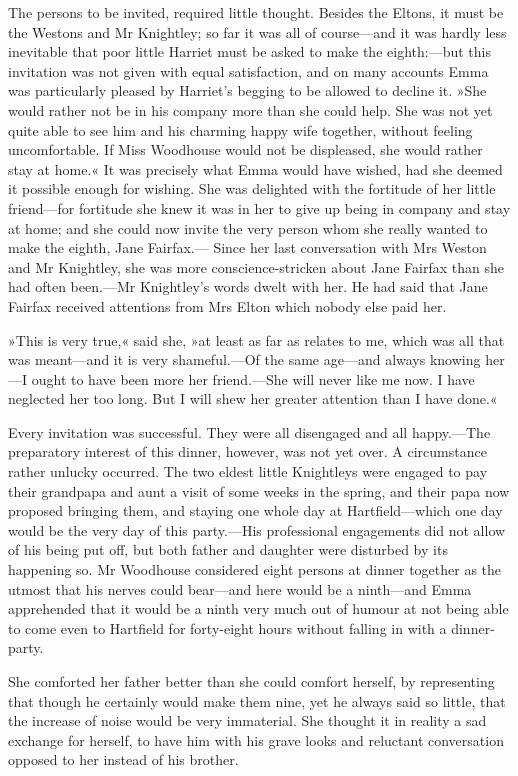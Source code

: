 The persons to be invited, required little thought. Besides the Eltons, it must be the Westons and Mr Knightley; so far it was all of course—and it was hardly less inevitable that poor little Harriet must be asked to make the eighth:—but this invitation was not given with equal satisfaction, and on many accounts Emma was particularly pleased by Harriet's begging to be allowed to decline it. »She would rather not be in his company more than she could help. She was not yet quite able to see him and his charming happy wife together, without feeling uncomfortable. If Miss Woodhouse would not be displeased, she would rather stay at home.« It was precisely what Emma would have wished, had she deemed it possible enough for wishing. She was delighted with the fortitude of her little friend—for fortitude she knew it was in her to give up being in company and stay at home; and she could now invite the very person whom she really wanted to make the eighth, Jane Fairfax.— Since her last conversation with Mrs Weston and Mr Knightley, she was more conscience-stricken about Jane Fairfax than she had often been.—Mr Knightley's words dwelt with her. He had said that Jane Fairfax received attentions from Mrs Elton which nobody else paid her.

»This is very true,« said she, »at least as far as relates to me, which was all that was meant—and it is very shameful.—Of the same age—and always knowing her—I ought to have been more her friend.—She will never like me now. I have neglected her too long. But I will shew her greater attention than I have done.«

Every invitation was successful. They were all disengaged and all happy.—The preparatory interest of this dinner, however, was not yet over. A circumstance rather unlucky occurred. The two eldest little Knightleys were engaged to pay their grandpapa and aunt a visit of some weeks in the spring, and their papa now proposed bringing them, and staying one whole day at Hartfield—which one day would be the very day of this party.—His professional engagements did not allow of his being put off, but both father and daughter were disturbed by its happening so. Mr Woodhouse considered eight persons at dinner together as the utmost that his nerves could bear—and here would be a ninth—and Emma apprehended that it would be a ninth very much out of humour at not being able to come even to Hartfield for forty-eight hours without falling in with a dinner-party.

She comforted her father better than she could comfort herself, by representing that though he certainly would make them nine, yet he always said so little, that the increase of noise would be very immaterial. She thought it in reality a sad exchange for herself, to have him with his grave looks and reluctant conversation opposed to her instead of his brother.

